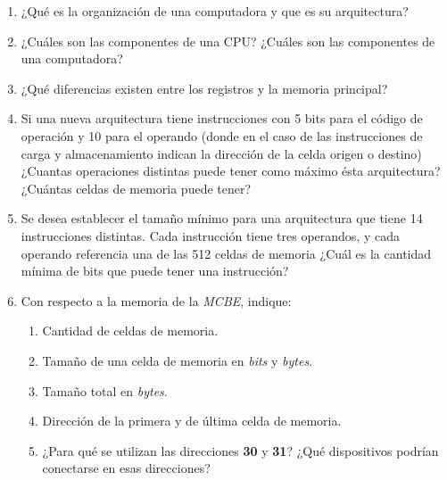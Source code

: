 \documentclass[12pt]{article}
\begin{document}
\begin{enumerate}
    \itemsep2pt \parskip0pt 

    \item ¿Qué es la organización de una computadora y que es su arquitectura?

    \item ¿Cuáles son las componentes de una CPU? ¿Cuáles son las componentes
        de una computadora?

    \item ¿Qué diferencias existen entre los registros y la memoria principal?

    \item Si una nueva arquitectura tiene instrucciones con 5 bits para el
        código de operación y 10 para el operando (donde en el caso de las
        instrucciones de carga y almacenamiento indican la dirección de la
        celda origen o destino) ¿Cuantas operaciones distintas puede tener
        como máximo ésta arquitectura? ¿Cuántas celdas de memoria puede tener?

    \item Se desea establecer el tamaño mínimo para una arquitectura que tiene
        14 instrucciones distintas. Cada instrucción tiene tres operandos, y
        cada operando referencia una de las 512 celdas de memoria ¿Cuál es la
        cantidad mínima de bits que puede tener una instrucción?

    \item Con respecto a la memoria de la \emph{MCBE}, indique:

        \begin{enumerate}

            \item Cantidad de celdas de memoria.

            \item Tamaño de una celda de memoria en \emph{bits}
                y \emph{bytes}.

            \item Tamaño total en \emph{bytes}.

            \item Dirección de la primera y de última celda de memoria.

            \item ¿Para qué se utilizan las direcciones \textbf{30} y
                \textbf{31}? ¿Qué dispositivos podrían conectarse en esas
                direcciones?

        \end{enumerate}


\end{enumerate}
\end{document}
